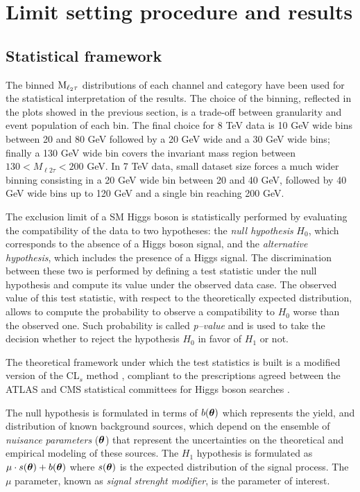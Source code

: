 \section{Limit setting procedure and results}

\subsection{Statistical framework}
The binned $\rm{M}_{\ell_2 \tau}$ distributions of each channel and category have been used for the statistical interpretation of the results. The choice of the binning, reflected in the plots showed in the previous section, is a trade-off between granularity and event population of each bin. The final choice for 8 TeV data is 10 GeV wide bins between 20 and 80 GeV followed by a 20 GeV wide and a 30 GeV wide bins; finally a 130 GeV wide bin covers the invariant mass region between $130 < M_{\ell 2 \tau} < 200$ GeV. In 7 TeV data, small dataset size forces a much wider binning consisting in a 20 GeV wide bin between 20 and 40 GeV, followed by 40 GeV wide bins up to 120 GeV and a single bin reaching 200 GeV.

The exclusion limit of a SM Higgs boson is statistically performed by evaluating the compatibility of the data to two hypotheses: the \emph{null hypothesis} $H_0$, which corresponds to the absence of a Higgs boson signal, and the  \emph{alternative hypothesis}, which includes the presence of a Higgs signal. The discrimination between these two is performed by defining a test statistic under the null hypothesis and compute its value under the observed data case. The observed value of this test statistic, with respect to the theoretically expected distribution, allows to compute the probability to observe a compatibility to $H_0$ worse than the observed one. Such probability is called \emph{p--value} and is used to take the decision whether to reject the hypothesis $H_0$ in favor of $H_1$ or not.

The theoretical framework under which the test statistics is built is a modified version of the CL$_s$ method \cite{CLs}, compliant to the prescriptions agreed between the ATLAS and CMS statistical committees for Higgs boson searches \cite{higgscombo}.

The null hypothesis is formulated in terms of $b(\boldtheta)$ which represents the yield, and distribution of known background sources, which depend on the ensemble of \emph{nuisance parameters} ($\boldtheta$) that represent the uncertainties on the theoretical and empirical modeling of these sources. The $H_1$ hypothesis is formulated as  $\mu \cdot s(\boldtheta) + b(\boldtheta)$ where $s(\boldtheta)$ is the expected distribution of the signal process. The $\mu$ parameter, known as \emph{signal strenght modifier}, is the parameter of interest.


